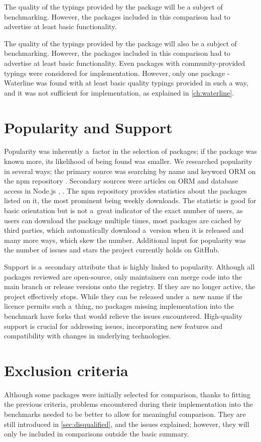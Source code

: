 The quality of the typings provided by the package will be a subject of
benchmarking. However, the packages included in this comparison had to advertise
at least basic functionality.

The quality of the typings provided by the package will also be a subject of
benchmarking. However, the packages included in this comparison had to advertise
at least basic functionality. Even packages with community-provided typings were
considered for implementation. However, only one package - Waterline was found
with at least basic quality typings provided in such a way, and it was not
sufficient for implementation, as explained in \autoref{ch:waterline}.

\section{Popularity and Support}
Popularity was inherently a~factor in the selection of packages; if the package
was known more, its likelihood of being found was smaller. We researched
popularity in several ways; the primary source was searching by name and keyword
ORM on the npm repository \cite{npmSearchORM}. Secondary sources were articles
on ORM and database access in Node.js \cite{SitePoint_2021}, \cite{Wang_2020}.
The npm repository provides statistics about the packages listed on it, the most
prominent being weekly downloads. The statistic is good for basic orientation
but is not a~great indicator of the exact number of users, as users can download
the package multiple times, most packages are cached by third parties, which
automatically download a~version when it is released and many more ways, which
skew the number. Additional input for popularity was the number of issues and
stars the project currently holds on GitHub.

Support is a~secondary attribute that is highly linked to popularity. Although
all packages reviewed are open-source, only maintainers can merge code into the
main branch or release versions onto the registry. If they are no longer active,
the project effectively stops. While they can be released under a~new name if
the licence permits such a~thing, no packages missing implementation into the
benchmark have forks that would relieve the issues encountered. High-quality
support is crucial for addressing issues, incorporating new features and
compatibility with changes in underlying technologies.

\section{Exclusion criteria}
Although some packages were initially selected for comparison, thanks to fitting
the previous criteria, problems encountered during their implementation into the
benchmarks needed to be better to allow for meaningful comparison. They are
still introduced in \autoref{sec:disqualified}, and the issues explained;
however, they will only be included in comparisons outside the basic summary.

